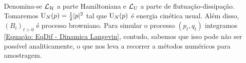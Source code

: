 Denomina-se $\operatorname{\mathcal{L}}_{\operatorname{\mathcal{H}}}$ a parte Hamiltoniana e $\operatorname{\mathcal{L}}_{\operatorname{U}}$ a parte de flutuação-dissipação. Tomaremos $\operatorname{U}_N(p) = \frac{1}{2} |p|^2$ tal que $\operatorname{U}_N(p)$ é energia cinética usual. Além disso, $(B_t)_{t>0}$ é processo browniano. Para simular o processo $(p_t,q_t)$ integramos \ref{Equação: EqDif - Dinamica Langevin}, contudo, sabemos que isso pode não ser possível analiticamente, o que nos leva a recorrer a métodos numéricos para amostragem.